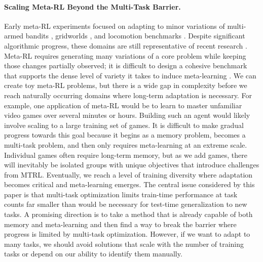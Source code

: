 \paragraph{Scaling Meta-RL Beyond the Multi-Task Barrier.} Early meta-RL experiments focused on adapting to minor variations of multi-armed bandits \cite{wang2016learning}, gridworlds \cite{stadie2018some}, and locomotion benchmarks \cite{rakelly2019efficient, finn2017model, rothfuss2018promp}. Despite significant algorithmic progress, these domains are still representative of recent research \cite{beck2024splagger, laskin2022context, ni2022recurrent, rimon2024mamba}. Meta-RL requires generating many variations of a core problem while keeping those changes partially observed; it is difficult to design a cohesive benchmark that supports the dense level of variety it takes to induce meta-learning \cite{team2023human, wang2021alchemy}. We can create toy meta-RL problems, but there is a wide gap in complexity before we reach naturally occurring domains where long-term adaptation is necessary. For example, one application of meta-RL would be to learn to master unfamiliar video games over several minutes or hours. Building such an agent would likely involve scaling to a large training set of games. It is difficult to make gradual progress towards this goal because it begins as a memory problem, becomes a multi-task problem, and then only requires meta-learning at an extreme scale. Individual games often require long-term memory, but as we add games, there will inevitably be isolated groups with unique objectives that introduce challenges from MTRL. Eventually, we reach a level of training diversity where adaptation becomes critical and meta-learning emerges. The central issue considered by this paper is that multi-task optimization limits train-time performance at task counts far smaller than would be necessary for test-time generalization to new tasks. A promising direction is to take a method that is already capable of both memory and meta-learning and then find a way to break the barrier where progress is limited by multi-task optimization. However, if we want to adapt to many tasks, we should avoid solutions that scale with the number of training tasks or depend on our ability to identify them manually. 

